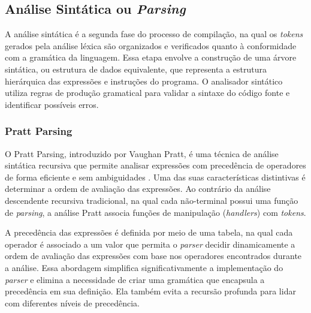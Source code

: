 \documentclass[english, 
               brazil, 
               bsc] %
               {dcomp-abntex2}
\begin{document}
\subsection{Análise Sintática ou \textit{Parsing}}
A análise sintática é a segunda fase do processo de compilação, na qual os \textit{tokens} gerados pela análise léxica são organizados e verificados quanto à conformidade com a gramática da linguagem. Essa etapa envolve a construção de uma árvore sintática, ou estrutura de dados equivalente, que representa a estrutura hierárquica das expressões e instruções do programa. O analisador sintático utiliza regras de produção gramatical para validar a sintaxe do código fonte e identificar possíveis erros.


\subsubsection{Pratt Parsing}
O Pratt Parsing, introduzido por Vaughan Pratt, é uma técnica de análise sintática recursiva que permite analisar expressões com precedência de operadores de forma eficiente e sem ambiguidades \cite{pratt}. Uma das suas características distintivas é determinar a ordem de avaliação das expressões. Ao contrário da análise descendente recursiva tradicional, na qual cada não-terminal possui uma função de \textit{parsing}, a análise Pratt associa funções de manipulação (\textit{handlers}) com \textit{tokens}.


A precedência das expressões é definida por meio de uma tabela, na qual cada operador é associado a um valor que permita o \textit{parser} decidir dinamicamente a ordem de avaliação das expressões com base nos operadores encontrados durante a análise. Essa abordagem simplifica significativamente a implementação do \textit{parser} e elimina a necessidade de criar uma gramática que encapsula a precedência em sua definição. Ela também evita a recursão profunda para lidar com diferentes níveis de precedência.
\end{document}
